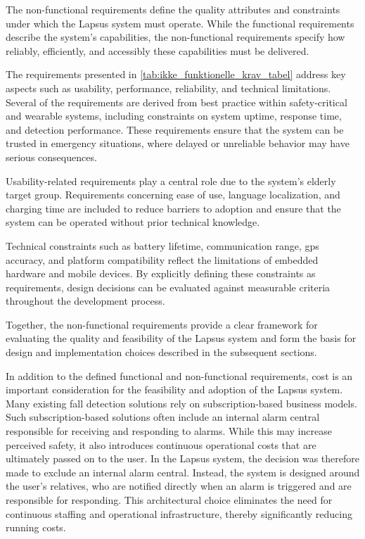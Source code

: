 The non-functional requirements define the quality attributes and constraints under which the Lapsus system must operate. While the functional requirements describe the system’s capabilities, the non-functional requirements specify how reliably, efficiently, and accessibly these capabilities must be delivered.



The requirements presented in \autoref{tab:ikke_funktionelle_krav_tabel} address key aspects such as usability, performance, reliability, and technical limitations. Several of the requirements are derived from best practice within safety-critical and wearable systems, including constraints on system uptime, response time, and detection performance. These requirements ensure that the system can be trusted in emergency situations, where delayed or unreliable behavior may have serious consequences.

Usability-related requirements play a central role due to the system’s elderly target group. Requirements concerning ease of use, language localization, and charging time are included to reduce barriers to adoption and ensure that the system can be operated without prior technical knowledge.

Technical constraints such as battery lifetime, communication range, \gls{gps} accuracy, and platform compatibility reflect the limitations of embedded hardware and mobile devices. By explicitly defining these constraints as requirements, design decisions can be evaluated against measurable criteria throughout the development process.

Together, the non-functional requirements provide a clear framework for evaluating the quality and feasibility of the Lapsus system and form the basis for design and implementation choices described in the subsequent sections.

In addition to the defined functional and non-functional requirements, cost is an important consideration for the feasibility and adoption of the Lapsus system. Many existing fall detection solutions rely on subscription-based business models. Such subscription-based solutions often include an internal alarm central responsible for receiving and responding to alarms. While this may increase perceived safety, it also introduces continuous operational costs that are ultimately passed on to the user. In the Lapsus system, the decision was therefore made to exclude an internal alarm central. Instead, the system is designed around the user’s relatives, who are notified directly when an alarm is triggered and are responsible for responding. This architectural choice eliminates the need for continuous staffing and operational infrastructure, thereby significantly reducing running costs.


